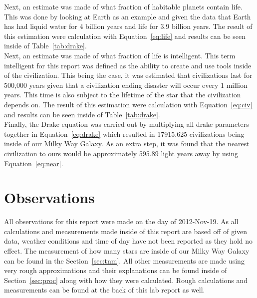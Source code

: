 \documentclass{article}
\begin{document}
Next, an estimate was made of what fraction of habitable planets contain life. This was done by looking at Earth as an example and given the data
that Earth has had liquid water for 4 billion years and life for 3.9 billion years. The result of this estimation were calculation with Equation~\ref{eq:life} 
and results can be seen inside of Table~\ref{tab:drake}.\\

Next, an estimate was made of what fraction of life is intelligent. This term intelligent for this report was defined as the ability to create and use
tools inside of the civilization. This being the case, it was estimated that civilizations last for 500,000 years given that a civilization ending 
disaster will occur every 1 million years. This time is also subject to the lifetime of the star that the civilization depends on.
The result of this estimation were calculation with Equation~\ref{eq:civ} and results can be seen inside of Table~\ref{tab:drake}.\\

Finally, the Drake equation was carried out by multiplying all drake parameters together in Equation~\ref{eq:drake} which resulted in
17915.625 civilizations being inside of our Milky Way Galaxy. As an extra step, it was found that the nearest civilization to ours would
be approximately 595.89 light years away by using Equation~\ref{eq:near}.\\



\section{Observations}

All observations for this report were made on the day of 2012-Nov-19. As all calculations and measurements made inside of this report are based off of
given data, weather conditions and time of day have not been reported as they hold no effect. The measurement of how many stars are inside of our
Milky Way Galaxy can be found in the Section~\ref{sec:tnm}. All other measurements are made using very rough approximations and their explanations
can be found inside of Section~\ref{sec:proc} along with how they were calculated. Rough calculations and measurements can be found at the back of
this lab report as well.\\
\end{document}
